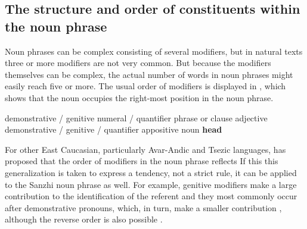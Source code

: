 
\subsection{The structure and order of constituents within the noun phrase}
\label{ssec:The structure and order of constituents within the noun phrase}

Noun phrases can be complex consisting of several modifiers, but in natural texts three or more modifiers are not very common. But because the modifiers themselves can be complex, the actual number of words in noun phrases might easily reach five or more. The usual order of modifiers is displayed in , which shows that the noun occupies the right-most position in the noun phrase.
%
\begin{exe}
	\ex	 demonstrative / genitive	\newline\hspace*{1.5em}	numeral / quantifier	\newline\hspace*{3.0em}	phrase or clause	\newline\hspace*{4.5em}	adjective	\newline\hspace*{6.0em}	demonstrative / genitive / quantifier	\newline\hspace*{7.5em}	appositive noun	\newline\hspace*{9.0em}	\textbf{head} 	\label{ex:Modifiers and their order in the NP}
\end{exe}

For other East Caucasian, particularly Avar-Andic and Tsezic languages, \citet[654]{Testelec1998a} has proposed that the order of modifiers in the noun phrase reflects  If this this generalization is taken to express a tendency, not a strict rule, it can be applied to the Sanzhi noun phrase as well. For example, genitive modifiers make a large contribution to the identification of the referent and they most commonly occur after demonstrative pronouns, which, in turn, make a smaller contribution , although the reverse order is also possible . 

